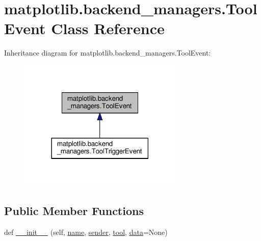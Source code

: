 \hypertarget{classmatplotlib_1_1backend__managers_1_1ToolEvent}{}\section{matplotlib.\+backend\+\_\+managers.\+Tool\+Event Class Reference}
\label{classmatplotlib_1_1backend__managers_1_1ToolEvent}


Inheritance diagram for matplotlib.\+backend\+\_\+managers.\+Tool\+Event\+:
\nopagebreak
\begin{figure}[H]
\begin{center}
\leavevmode
\includegraphics[width=222pt]{classmatplotlib_1_1backend__managers_1_1ToolEvent__inherit__graph}
\end{center}
\end{figure}
\subsection*{Public Member Functions}
\begin{DoxyCompactItemize}
\item 
def \hyperlink{classmatplotlib_1_1backend__managers_1_1ToolEvent_aee611a78577d9fa0c581cbd5c4a7f5fc}{\+\_\+\+\_\+init\+\_\+\+\_\+} (self, \hyperlink{classmatplotlib_1_1backend__managers_1_1ToolEvent_a911e0e0aa3846d264fcf064a3b7b887d}{name}, \hyperlink{classmatplotlib_1_1backend__managers_1_1ToolEvent_a00635a362e6b1ad9e98be07804cb77a0}{sender}, \hyperlink{classmatplotlib_1_1backend__managers_1_1ToolEvent_a29cbd299e8a363ba74f8fcd50175b51e}{tool}, \hyperlink{classmatplotlib_1_1backend__managers_1_1ToolEvent_a26c96380714e79bad2d447ebc80ec6e3}{data}=None)
\end{DoxyCompactItemize}
